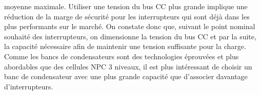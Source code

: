 moyenne maximale. Utiliser une tension du bus CC plus grande implique une réduction de la marge de sécurité pour les interrupteurs qui sont déjà dans les plus performants sur le marché. On constate donc que, suivant le point nominal souhaité des interrupteurs, on dimensionne la tension du bus CC et par la suite, la capacité nécessaire afin de maintenir une tension suffisante pour la charge. Comme les bancs de condensateurs sont des technologies éprouvées et plus abordables que des cellules NPC 3 niveaux, il est plus intéressant de choisir un banc de condensateur avec une plus grande capacité que d'associer davantage d'interrupteurs.
